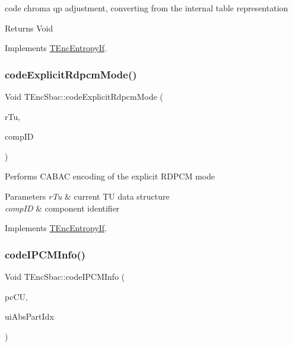 code chroma qp adjustment, converting from the internal table representation \begin{DoxyReturn}{Returns}
Void 
\end{DoxyReturn}


Implements \hyperlink{class_t_enc_entropy_if}{T\+Enc\+Entropy\+If}.

\mbox{\label{class_t_enc_sbac_abce0153f9a8086cca9310bdf1db88740}} 
\subsubsection{\texorpdfstring{code\+Explicit\+Rdpcm\+Mode()}{codeExplicitRdpcmMode()}}
{\footnotesize\ttfamily Void T\+Enc\+Sbac\+::code\+Explicit\+Rdpcm\+Mode (\begin{DoxyParamCaption}\item[{\hyperlink{class_t_com_t_u}{T\+Com\+TU} \&}]{r\+Tu,  }\item[{const Component\+ID}]{comp\+ID }\end{DoxyParamCaption})\hspace{0.3cm}{\ttfamily [virtual]}}

Performs C\+A\+B\+AC encoding of the explicit R\+D\+P\+CM mode 
\begin{DoxyParams}{Parameters}
{\em r\+Tu} & current TU data structure \\
\hline
{\em comp\+ID} & component identifier \\
\hline
\end{DoxyParams}


Implements \hyperlink{class_t_enc_entropy_if}{T\+Enc\+Entropy\+If}.

\mbox{\label{class_t_enc_sbac_a3fd9e3057ad1215862ea0716e6e12349}} 
\subsubsection{\texorpdfstring{code\+I\+P\+C\+M\+Info()}{codeIPCMInfo()}}
{\footnotesize\ttfamily Void T\+Enc\+Sbac\+::code\+I\+P\+C\+M\+Info (\begin{DoxyParamCaption}\item[{\hyperlink{class_t_com_data_c_u}{T\+Com\+Data\+CU} $\ast$}]{pc\+CU,  }\item[{U\+Int}]{ui\+Abs\+Part\+Idx }\end{DoxyParamCaption})\hspace{0.3cm}{\ttfamily [virtual]}}

